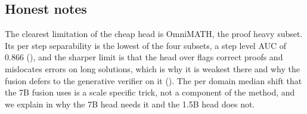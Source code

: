 \subsection{Honest notes}
\label{sec:exp-honest}

The clearest limitation of the cheap head is OmniMATH, the proof heavy subset. Its per step separability is the lowest of the four subsets, a step level AUC of 0.866 (), and the sharper limit is that the head over flags correct proofs and mislocates errors on long solutions, which is why it is weakest there and why the fusion defers to the generative verifier on it (). The per domain median shift that the 7B fusion uses is a scale specific trick, not a component of the method, and we explain in  why the 7B head needs it and the 1.5B head does not.
